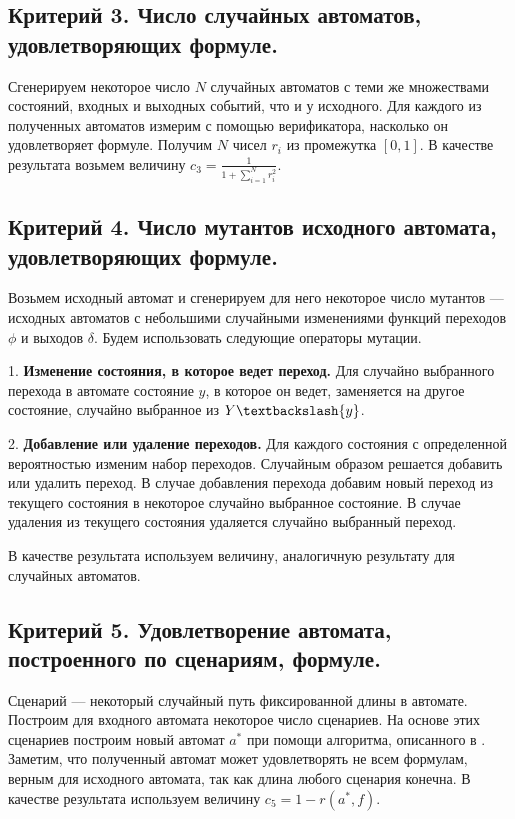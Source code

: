 \documentclass[12pt,fleqn]{article}
\begin{document}
\subsection{Критерий 3. Число случайных автоматов, удовлетворяющих формуле.}

Сгенерируем некоторое число $N$ случайных автоматов с теми же множествами состояний, входных и выходных событий, что и
у исходного. Для каждого из полученных автоматов измерим с помощью верификатора, насколько он удовлетворяет формуле.
Получим $N$ чисел $r_i$ из промежутка $[0, 1]$. В качестве результата возьмем величину $c_3 = \frac{1}{1 + \sum_{i = 1}^{N}r_i^2}$.

\subsection{Критерий 4. Число мутантов исходного автомата, удовлетворяющих формуле.}

Возьмем исходный автомат и сгенерируем для него некоторое число мутантов --- исходных автоматов с небольшими
случайными изменениями функций переходов $\phi$ и выходов $\delta$. Будем использовать следующие операторы мутации.

1. \textbf{Изменение состояния, в которое ведет переход.} Для случайно выбранного перехода в автомате состояние $y$,
в которое он ведет, заменяется на другое состояние, случайно выбранное из $Y \textbackslash \{y\}$. 

2. \textbf{Добавление или удаление переходов.} Для каждого состояния с определенной вероятностью изменим набор переходов.
Случайным образом решается добавить или удалить переход. В случае добавления перехода добавим новый переход из
текущего состояния в некоторое случайно выбранное состояние. В случае удаления из текущего состояния удаляется
случайно выбранный переход.

В качестве результата используем величину, аналогичную результату для случайных автоматов.

\subsection{Критерий 5. Удовлетворение автомата, построенного по сценариям, формуле.}

Сценарий --- некоторый случайный путь фиксированной длины в автомате. Построим для входного автомата некоторое
число сценариев. На основе этих сценариев построим новый автомат $a^*$ при помощи алгоритма, описанного в \cite{eg}.
Заметим, что полученный автомат может удовлетворять не всем формулам, верным для исходного автомата, так как
длина любого сценария конечна. В качестве результата используем величину $c_5 = 1 - r(a^*, f)$.
\end{document}
